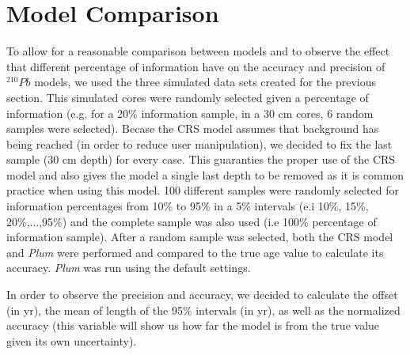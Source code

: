 \documentclass [10pt] {article}
\begin{document}
\section{Model Comparison}

To allow for a reasonable comparison between models and to observe the effect that different percentage of information have on the accuracy and precision of $^{210}Pb$ models, we used the three simulated data sets created for the previous section. 
This simulated cores were randomly selected given a percentage of information (e.g. for a 20\% information sample, in a 30 cm cores, 6 random samples were selected). 
Becase the CRS model assumes that background has being reached (in order to reduce user manipulation), we decided to fix the last sample (30 cm depth) for every case.
This guaranties the proper use of the CRS model and also gives the model a single last depth to be removed as it is common practice when using this model.
100 different samples were randomly selected for information percentages from 10\% to 95\% in a 5\% intervals (e.i 10\%, 15\%, 20\%,...,95\%)  and the complete sample was also used (i.e 100\% percentage of information sample).
After a random sample was selected, both the CRS model and \textit{Plum} were performed and compared to the true age value to calculate its accuracy.
\textit{Plum} was run using the default settings.

In order to observe the precision and accuracy, we decided to calculate the offset (in yr), the mean of length of the 95\% intervals (in yr), as well as the normalized accuracy (this variable will show us how far the model is from the true value given its own uncertainty).  
\end{document}
